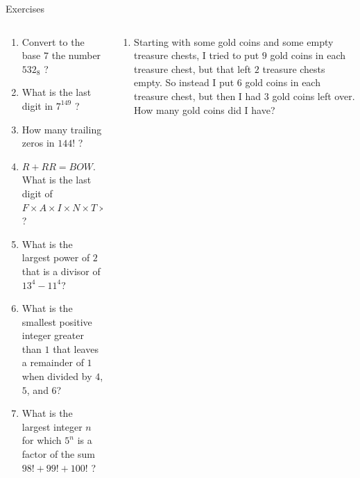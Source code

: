 \documentclass[9pt,aspectratio=169]{beamer}
\begin{document}

\begin{frame}{Exercises}
  \begin{columns}[T]
    \begin{column}{0.5\textwidth}
      \begin{enumerate}
        \item Convert to the base $7$ the number $532_8$ ?
        \item What is the last digit in $7^{149}$ ?
        \item How many trailing zeros in $144!$ ?
        \item $R + RR = BOW$. What is the last digit of $F \times A \times I \times N \times T \times I \times N \times G$?
        \item What is the largest power of $2$ that is a divisor of $13^4 - 11^4$?
        \item What is the smallest positive integer greater than $1$ that leaves a remainder of $1$ when divided by $4$, $5$, and $6$?
        \item What is the largest integer $n$ for which $5^n$ is a factor of the sum $98!+99!+100!$ ?
        \seti
      \end{enumerate}
    \end{column}
    \begin{column}{0.5\textwidth}
      \begin{enumerate}
        \conti
        \item Starting with some gold coins and some empty treasure chests, I tried to put $9$ gold coins in each treasure chest, but that left $2$ treasure chests empty. So instead I put $6$ gold coins in each treasure chest, but then I had $3$ gold coins left over. How many gold coins did I have?
      \end{enumerate}
    \end{column}
  \end{columns}
\end{frame}
\end{document}
